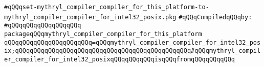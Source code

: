 \label{src/lib/core/mythryl-compiler-compiler/set-mythryl_compiler_compiler_for_this_platform-to-mythryl_compiler_compiler_for_intel32_posix.pkg}
\verb|#qQQqset-mythryl_compiler_compiler_for_this_platform-to-mythryl_compiler_compiler_for_intel32_posix.pkg|\newline
\newline
\verb|#qQQqCompiledqQQqby:|\newline
\verb|#qQQqqQQqqQQqqQQqqQQq|\newline
\newline
\verb|packageqQQqmythryl_compiler_compiler_for_this_platform|\newline
\verb|qQQqqQQqqQQqqQQqqQQqqQQq=qQQqmythryl_compiler_compiler_for_intel32_posix;qQQqqQQqqQQqqQQqqQQqqQQqqQQqqQQqqQQqqQQqqQQqqQQq#qQQqmythryl_compiler_compiler_for_intel32_posixqQQqqQQqqQQqisqQQqfromqQQqqQQqqQQq|\newline
\newline

